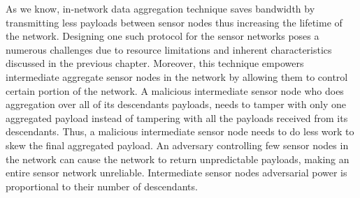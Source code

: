 	As we know, in-network data aggregation technique saves bandwidth by transmitting less payloads between sensor nodes thus increasing the lifetime of the network.
	Designing one such protocol for the sensor networks poses a numerous challenges due to resource limitations and inherent characteristics discussed in the previous chapter.	
	Moreover, this technique empowers intermediate aggregate sensor nodes in the network by allowing them to control certain portion of the network.
	A malicious intermediate sensor node who does aggregation over all of its descendants payloads, needs to tamper with only one aggregated payload instead of tampering with all the payloads received from its descendants. 
	Thus, a malicious intermediate sensor node needs to do less work to skew the final aggregated payload.
	An adversary controlling few sensor nodes in the network can cause the network to return unpredictable payloads, making an entire sensor network unreliable.
	Intermediate sensor nodes adversarial power is proportional to their number of descendants.

